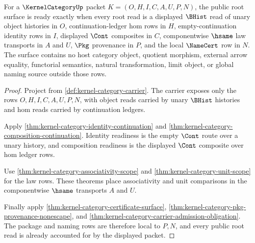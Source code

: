 \begin{theorem}
\label{thm:kernel-category-root-public-readiness}
For a $\KernelCategoryUp$ packet $K=(O,H,I,C,A,U,P,N)$, the public root surface is ready exactly when every root read is a displayed $\BHist$ read of unary object histories in $O$, continuation-ledger hom rows in $H$, empty-continuation identity rows in $I$, displayed $\Cont$ composites in $C$, componentwise $\hsame$ law transports in $A$ and $U$, $\Pkg$ provenance in $P$, and the local $\NameCert$ row in $N$. The surface contains no host category object, quotient morphism, external arrow equality, functorial semantics, natural transformation, limit object, or global naming source outside those rows.
\end{theorem}
\begin{proof}
Project from \autoref{def:kernel-category-carrier}. The carrier exposes only the rows $O,H,I,C,A,U,P,N$, with object reads carried by unary $\BHist$ histories and hom reads carried by continuation ledgers.

Apply \autoref{thm:kernel-category-identity-continuation} and \autoref{thm:kernel-category-composition-continuation}. Identity readiness is the empty $\Cont$ route over a unary history, and composition readiness is the displayed $\Cont$ composite over hom ledger rows.

Use \autoref{thm:kernel-category-associativity-scope} and \autoref{thm:kernel-category-unit-scope} for the law rows. These theorems place associativity and unit comparisons in the componentwise $\hsame$ transports $A$ and $U$.

Finally apply \autoref{thm:kernel-category-certificate-surface}, \autoref{thm:kernel-category-pkg-provenance-nonescape}, and \autoref{thm:kernel-category-carrier-admission-obligation}. The package and naming rows are therefore local to $P,N$, and every public root read is already accounted for by the displayed packet.
\end{proof}

